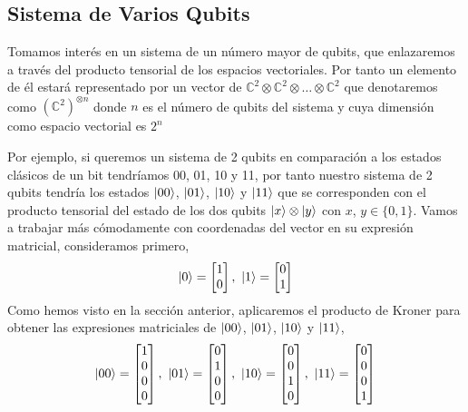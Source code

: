 \documentclass[a4paper]{article}
\numberwithin{equation}{section}
\begin{document}
\subsection{Sistema de Varios Qubits}

Tomamos interés en un sistema de un número mayor de qubits, que enlazaremos a través del producto tensorial de los espacios vectoriales. Por tanto un elemento de él estará representado por un vector de $\mathbb{C}^2 \otimes \mathbb{C}^2 \otimes \ldots \otimes \mathbb{C}^2$ que denotaremos como $(\mathbb{C}^2)^{\otimes n}$ donde $n$ es el número de qubits del sistema y cuya dimensión como espacio vectorial es $2^n$

Por ejemplo, si queremos un sistema de 2 qubits en comparación a los estados clásicos de un bit tendríamos 00, 01, 10 y 11, por tanto nuestro sistema de 2 qubits tendría los estados $\ket{00}$, $\ket{01}$, $\ket{10}$ y $\ket{11}$ que se corresponden con el producto tensorial del estado de los dos qubits $\ket{x}\otimes\ket{y}$ con $x$, $y\in \lbrace 0, 1\rbrace$.
Vamos a trabajar más cómodamente con coordenadas del vector en su expresión matricial, consideramos primero,
\begin{equation}
\ket{0} = \begin{bmatrix}
	1 \\ 0
\end{bmatrix}, \ 
\ket{1} = \begin{bmatrix}
	0 \\ 1
\end{bmatrix}
\end{equation}
Como hemos visto en la sección anterior, aplicaremos el producto de  Kroner para obtener las expresiones matriciales de $\ket{00}$, $\ket{01}$, $\ket{10}$ y $\ket{11}$,
\begin{equation}
\ket{00} =
\begin{bmatrix}
	1 \\ 0 \\ 0 \\ 0
\end{bmatrix}, \ 
\ket{01} =
\begin{bmatrix}
	0 \\ 1 \\ 0 \\ 0
\end{bmatrix}, \ 
\ket{10} =
\begin{bmatrix}
	0 \\ 0 \\ 1 \\ 0
\end{bmatrix}, \ 
\ket{11} =
\begin{bmatrix}
	0 \\ 0 \\ 0 \\ 1
\end{bmatrix}
\end{equation}
\end{document}
